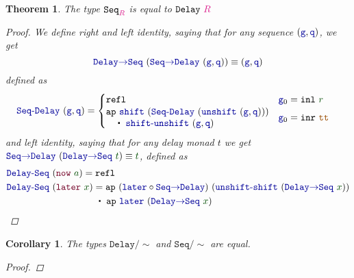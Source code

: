 \documentclass[twoside,11pt,openright]{report}
\theoremstyle{plain} %
\newtheorem{thm}{Theorem}[section]
\newtheorem*{cor}{Corollary}
\theoremstyle{definition}
\theoremstyle{remark}
\newcommand*{\term}[1]{\textcolor{green!30!black}{#1}} %
\newcommand*{\type}[1]{\textcolor{magenta!90!black}{#1}}
\newcommand*{\constant}[1]{\textcolor{orange!60!black}{\ensuremath{\mathtt{#1}}}}
\newcommand*{\function}[1]{\textcolor{blue!60!black}{\ensuremath{\mathtt{#1}}}}
\newcommand*{\constructor}[1]{\textcolor{purple!60!black}{\ensuremath{\mathtt{#1}}}}
\newcommand*{\typeformer}[1]{\ensuremath{\mathtt{#1}}}
\newcommand{\ct}{%
  \mathchoice{\mathbin{\raisebox{0.5ex}{$\displaystyle\centerdot$}}}%
             {\mathbin{\raisebox{0.5ex}{$\centerdot$}}}%
             {\mathbin{\raisebox{0.25ex}{$\scriptstyle\,\centerdot\,$}}}%
             {\mathbin{\raisebox{0.1ex}{$\scriptscriptstyle\,\centerdot\,$}}}
}
\begin{document}
\begin{thm}
  The type \(\typeformer{Seq}_{\type{R}}\) is equal to \(\typeformer{Delay}~\type{R}\)
  \begin{proof}  
    We define right and left identity, saying that for any sequence \((\function{g},\function{q})\), we get
    \begin{equation}
      \function{Delay{\rightarrow}Seq}~(\function{Seq{\rightarrow}Delay}~(\function{g},\function{q})) \equiv (\function{g},\function{q})
    \end{equation}
    defined as
    \begin{equation}
      \begin{aligned}
        \function{Seq\text{-}Delay}&~(\function{g},\function{q}) = \begin{cases} \mathtt{refl}  & \function{g}_0 = \mathtt{inl}~\term{r} \\ \begin{aligned} &\mathtt{ap}~\function{shift}~(\function{Seq\text{-}Delay}~(\function{unshift}~(\function{g} , \function{q}))) \\&\quad\ct~\function{shift\text{-}unshift}~(\function{g} , \function{q}) \end{aligned} & \function{g}_0 = \mathtt{inr}~\constant{tt} \end{cases}
      \end{aligned}
    \end{equation}
    and left identity, saying that for any delay monad \(t\) we get \(\function{Seq{\rightarrow}Delay}~(\function{Delay{\rightarrow}Seq}~\term{t}) \equiv \term{t}\), defined as
    \begin{equation}
      \begin{aligned}
        \function{Delay\text{-}Seq}&~(\constructor{now}~\term{a}) = \mathtt{refl} \\
        \function{Delay\text{-}Seq}&~(\constructor{later}~\term{x}) = \mathtt{ap}~(\function{later} \circ \function{Seq{\rightarrow}Delay})~(\function{unshift\text{-}shift}~(\function{Delay{\rightarrow}Seq}~\term{x})) \\ &\qquad\qquad\quad\ct~\mathtt{ap}~\function{later}~(\function{Delay{\rightarrow}Seq}~\term{x})
      \end{aligned}
    \end{equation}
  \end{proof}
\end{thm}
\begin{cor}
  The types \(\typeformer{Delay}/\sim\) and \(\typeformer{Seq}/\sim\) are equal.
  \begin{proof}
    
  \end{proof}
\end{cor}
\end{document}
